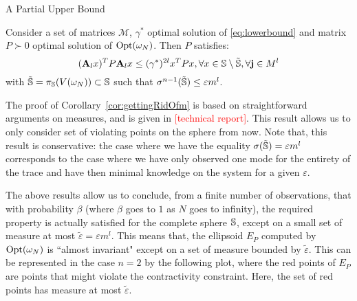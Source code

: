\begin{subsection}{A Partial Upper Bound}
\begin{cor}\label{cor:gettingRidOfm}
Consider a set of matrices $\mathcal{M}$, $\gamma^{*}$ optimal solution of \eqref{eq:lowerbound} and matrix $P \succ 0$ optimal solution of $\text{Opt}(\omega_N)$. Then $P$ satisfies: 
\begin{equation}\label{eqn:P0}
(\mathbf{A}_l x)^T P \mathbf{A}_l x \leq (\gamma^{*})^{2l} x^T P x, \forall x \in \mathbb{S} \setminus \tilde{\mathbb{S}}, \forall \mathbf{j} \in M^l
\end{equation} 
with $\tilde{\mathbb{S}} = \pi_{\mathbb{S}}(V(\omega_N)) \subset \mathbb{S}$ such that $\sigma^{n-1}(\tilde{\mathbb{S}}) \leq \varepsilon m^l $.
\end{cor}

The proof of Corollary~\ref{cor:gettingRidOfm} is based on straightforward arguments on measures, and is given in \textcolor{red}{[technical report]}. This result allows us to only consider set of violating points on the sphere from now. Note that, this result is conservative: the case where we have the equality $\sigma(\tilde{\mathbb{S}}) = \varepsilon m^l$ corresponds to the case where we have only observed one mode for the entirety of the trace and have then minimal knowledge on the system for a given $\varepsilon$.


The above results allow us to conclude, from a finite number of observations, that with probability $\beta$ (where $\beta$ goes to $1$ as $N$ goes to infinity), the required property is actually satisfied for the complete sphere $\mathbb{S}$, except on a small set of measure at most $\tilde{\varepsilon} = \varepsilon m^l$. This means that, the ellipsoid $E_P$ computed by $\text{Opt}(\omega_N)$ is ``almost invariant"  except on a set of measure bounded by $\tilde{\varepsilon}$. This can be represented in the case $n=2$ by the following plot, where the red points of $E_P$ are points that might violate the contractivity constraint. Here, the set of red points has measure at most $\tilde{\varepsilon}$.
\begin{figure}[H]\label{fig:ellipsoid}
\begin{center}
\end{center}
\end{figure}
\end{subsection}
